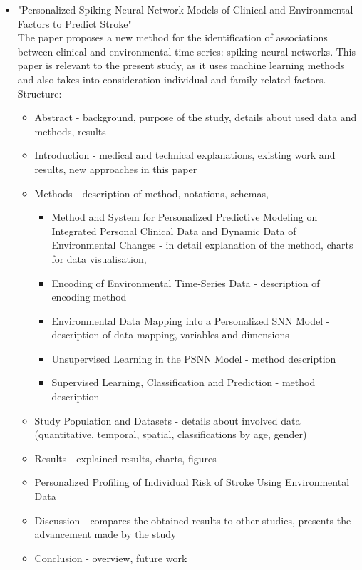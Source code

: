 \documentclass{article}
\begin{document}
\begin{itemize}
\item\large "Personalized Spiking Neural Network Models of Clinical and Environmental Factors to Predict Stroke"\\

\normalsize The paper \cite{Doborjeh:2022dg} proposes a new method for the identification of associations between clinical and environmental time series: spiking neural networks. This paper is relevant to the present study, as it uses machine learning methods and also takes into consideration individual and family related factors.\\

Structure:
\begin{itemize}
\item Abstract - background, purpose of the study, details about used data and methods, results
\item Introduction - medical and technical explanations, existing work and results, new approaches in this paper
\item Methods - description of method, notations, schemas, 
\begin{itemize}
\item Method and System for Personalized Predictive Modeling on Integrated Personal Clinical Data and Dynamic Data of Environmental Changes - in detail explanation of the method, charts for data visualisation, 
\item Encoding of Environmental Time‐Series Data - description of encoding method
\item Environmental Data Mapping into a Personalized SNN Model - description of data mapping, variables and dimensions
\item Unsupervised Learning in the PSNN Model - method description
\item Supervised Learning, Classification and Prediction - method description
\end{itemize}
\item Study Population and Datasets - details about involved data (quantitative, temporal, spatial, classifications by age, gender)
\item Results - explained results, charts, figures
\item Personalized Profiling of Individual Risk of Stroke Using Environmental Data
\item Discussion - compares the obtained results to other studies, presents the advancement made by the study
\item Conclusion - overview, future work
\begin{itemize}

\end{itemize}
\end{itemize}
\end{itemize}
\end{document}
